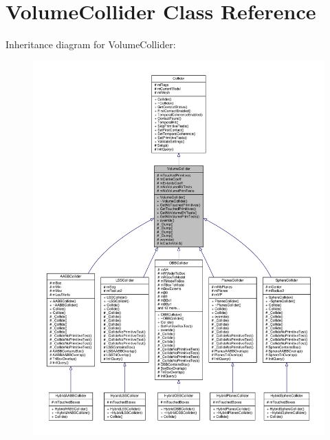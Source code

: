 \hypertarget{classVolumeCollider}{}\section{Volume\+Collider Class Reference}
\label{classVolumeCollider}


Inheritance diagram for Volume\+Collider\+:
\nopagebreak
\begin{figure}[H]
\begin{center}
\leavevmode
\includegraphics[width=350pt]{d0/d25/classVolumeCollider__inherit__graph}
\end{center}
\end{figure}


